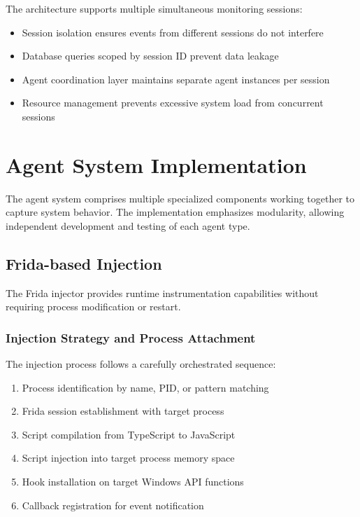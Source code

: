 The architecture supports multiple simultaneous monitoring sessions:

\begin{itemize}
    \item Session isolation ensures events from different sessions do not interfere
    \item Database queries scoped by session ID prevent data leakage
    \item Agent coordination layer maintains separate agent instances per session
    \item Resource management prevents excessive system load from concurrent sessions
\end{itemize}

\section{Agent System Implementation}

The agent system comprises multiple specialized components working together to capture system behavior. The implementation emphasizes modularity, allowing independent development and testing of each agent type.

\subsection{Frida-based Injection}

The Frida injector provides runtime instrumentation capabilities without requiring process modification or restart.

\subsubsection{Injection Strategy and Process Attachment}

The injection process follows a carefully orchestrated sequence:

\begin{enumerate}
    \item Process identification by name, PID, or pattern matching
    \item Frida session establishment with target process
    \item Script compilation from TypeScript to JavaScript
    \item Script injection into target process memory space
    \item Hook installation on target Windows API functions
    \item Callback registration for event notification
\end{enumerate}

